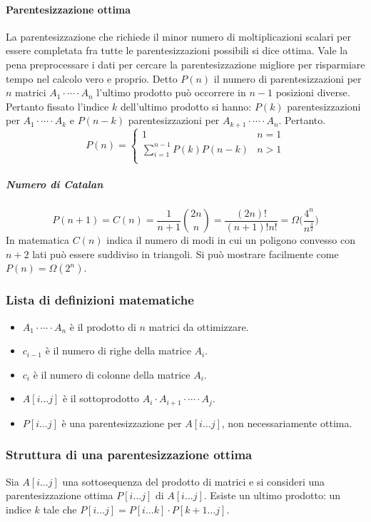 			\paragraph{Parentesizzazione ottima}
			La parentesizzazione che richiede il minor numero di moltiplicazioni scalari per essere completata fra tutte le parentesizzazioni possibili si dice 
			ottima. Vale la pena preprocessare i dati per cercare la parentesizzazione migliore per risparmiare tempo nel calcolo vero e proprio. Detto $P(n)$ il
			numero di parentesizzazioni per $n$ matrici $A_1\cdot\cdots\cdot A_n$ l'ultimo prodotto pu\`o occorrere in $n-1$ posizioni diverse. Pertanto fissato 
			l'indice $k$ dell'ultimo prodotto si hanno: $P(k)$ parentesizzazioni per $A_1\cdot\cdots\cdot A_k$ e $P(n-k)$ parentesizzazioni per  $A_{k+1}\cdot\cdots
			\cdot A_n$. Pertanto.
			$$P(n) = 
			\begin{cases}
				1 & n =1 \\
				\sum\limits_{i = 1}^{n-1} P(k)P(n-k) & n > 1\\
			\end{cases}$$
			\subparagraph{Numero di Catalan}
			$$P(n+1) = C(n) = \dfrac{1}{n+1}\binom{2n}{n} = \dfrac{(2n)!}{(n+1)!n!} = \Omega\biggl(\dfrac{4^n}{n^{\frac{3}{2}}}\biggr)$$
			In matematica $C(n)$ indica il numero di modi in cui un poligono convesso con $n+2$ lati pu\`o essere suddiviso in triangoli. Si pu\`o mostrare facilmente
			come $P(n)=\Omega(2^n)$. 
		\subsubsection{Lista di definizioni matematiche}
			\begin{itemize}
				\item $A_1\cdot\cdots\cdot A_n$ \`e il prodotto di $n$ matrici da ottimizzare.
				\item $c_{i-1}$ \`e il numero di righe della matrice $A_i$.
				\item $c_i$ \`e il numero di colonne della matrice $A_i$.
				\item $A[i\dots j]$ \`e il sottoprodotto $A_i\cdot A_{i+1}\cdot\cdots\cdot A_j$.
				\item $P[i\dots j]$ \`e una parentesizzazione per $A[i\dots j]$, non necessariamente ottima. 
			\end{itemize}
		\subsubsection{Struttura di una parentesizzazione ottima}
			Sia $A[i\dots j]$ una sottosequenza del prodotto di matrici e si consideri una parentesizzazione ottima $P[i\dots j]$ di $A[i\dots j]$. Esiste un ultimo
			prodotto: un indice $k$ tale che $P[i\dots j] = P[i\dots k]\cdot P[k+1\dots j]$.
